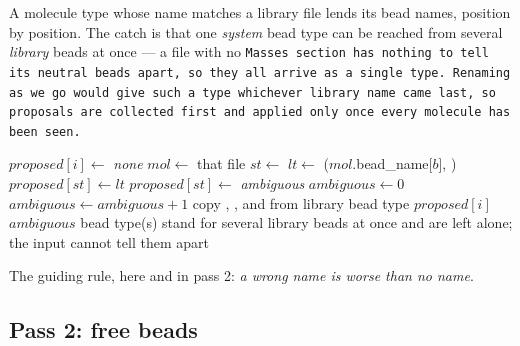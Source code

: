 A molecule type whose name matches a library file lends its bead names,
position by position. The catch is that one \emph{system} bead type can be
reached from several \emph{library} beads at once --- a \data file with no
\tt{Masses} section has nothing to tell its neutral beads apart, so they all
arrive as a single type. Renaming as we go would give such a type whichever
library name came last, so proposals are collected first and applied only once
every molecule has been seen.

\begin{algorithmic}[1]
    \St $proposed[i] \gets$ \emph{none}
  \EndFor
      \Continue
    \EndIf
      \Continue
    \EndIf
    \St $mol \gets$ that file
      \Continue{}
    \EndIf
      \St $st \gets$ 
      \St $lt \gets$ ($mol$.bead\_name[$b$],
        )
        \Continue
      \EndIf
        \St $proposed[st] \gets lt$
        \St $proposed[st] \gets$ \emph{ambiguous}
      \EndIf
    \EndFor
  \EndFor
  \St $ambiguous \gets 0$
      \St $ambiguous \gets ambiguous + 1$
      \Continue{}
    \EndIf
      \Continue
    \EndIf
    \St copy , ,  and  from library
      bead type $proposed[i]$
  \EndFor
    \Warn $ambiguous$ bead type(s) stand for several library beads at once and
      are left alone; the input cannot tell them apart
  \EndIf
\end{algorithmic}
\algbottomrule

\noindent
The guiding rule, here and in pass 2: \emph{a wrong name is worse than no
name}.

\subsection{Pass 2: free beads}\label{sec:LibPass2}

